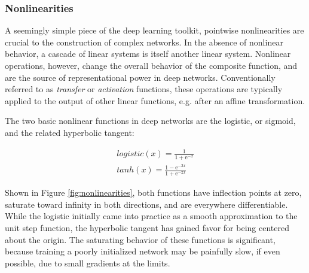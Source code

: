 



\subsubsection{Nonlinearities}

A seemingly simple piece of the deep learning toolkit, pointwise nonlinearities are crucial to the construction of complex networks.
In the absence of nonlinear behavior, a cascade of linear systems is itself another linear system.
Nonlinear operations, however, change the overall behavior of the composite function, and are the source of representational power in deep networks.
Conventionally referred to as \emph{transfer} or \emph{activation} functions, these operations are typically applied to the output of other linear functions, e.g. after an affine transformation.

The two basic nonlinear functions in deep networks are the logistic, or sigmoid, and the related hyperbolic tangent:

\begin{align*}
  logistic(x) = \frac{1}{1 + \mathrm{e}^{-x}}\\
  tanh(x) = \frac{1 - \mathrm{e}^{-2x}} {1 + \mathrm{e}^{-2x}}
\label{eq:basic_nonlinearities}
\end{align*}

Shown in Figure \ref{fig:nonlinearities}, both functions have inflection points at zero, saturate toward infinity in both directions, and are everywhere differentiable.
While the logistic initially came into practice as a smooth approximation to the unit step function, the hyperbolic tangent has gained favor for being centered about the origin.
The saturating behavior of these functions is significant, because training a poorly initialized network may be painfully slow, if even possible, due to small gradients at the limits.


